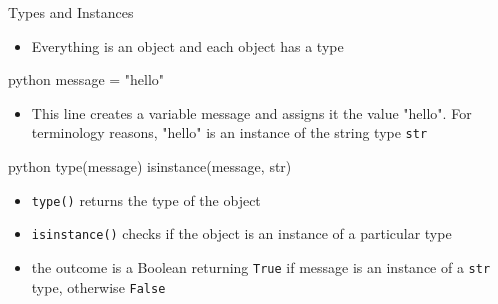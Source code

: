 \documentclass[
	11pt, 
]{beamer}
\begin{document}
\begin{frame}[fragile]{Types and Instances}

\begin{itemize}
    \item Everything is an object and each object has a type
\end{itemize}

\begin{mintedbox}{python}
message = "hello"
\end{mintedbox}

\begin{itemize}
    \item This line creates a variable message and assigns it the value "hello". For terminology reasons, "hello" is an instance of the string type \texttt{str}
\end{itemize}

\begin{mintedbox}{python}
type(message)
isinstance(message, str)
\end{mintedbox}

\begin{itemize}
    \item \texttt{type()} returns the type of the object
    \item \texttt{isinstance()} checks if the object is an instance of a particular type
    \item the outcome is a Boolean returning \texttt{True} if message is an instance of a \texttt{str} type, otherwise \texttt{False}
\end{itemize}


\end{frame}

\end{document}
